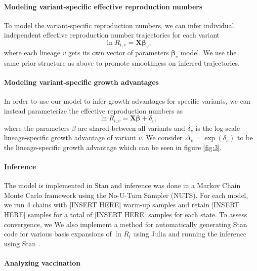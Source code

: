 \documentclass[12pt]{article}
\renewcommand{\vec}[1]{\boldsymbol{#1}}
\begin{document}
\paragraph{Modeling variant-specific effective reproduction numbers}%

To model the variant-specific reproduction numbers, we can infer individual independent effective reproduction number trajectories for each variant 
\begin{equation}
  \ln R_{t, v} = \vec{X} \vec{\beta}_{v},
\end{equation}
where each lineage $v$ gets its own vector of parameters $\vec{\beta}_{v}$ model. 
We use the same prior structure as above to promote smoothness on inferred trajectories.

\paragraph{Modeling variant-specific growth advantages}%

In order to use our model to infer growth advantages for specific variants, we can instead parameterize the effective reproduction numbers as
\begin{equation}
\ln R_{t,v} = \vec{X} \vec{\beta} + \delta_{v},
\end{equation}
where the parameters $\beta$ are shared between all variants and $\delta_{v}$ is the log-scale lineage-specific growth advantage of variant $v$. 
We consider $\Delta_{v} = \exp(\delta_{v})$ to be the lineage-specific growth advantage which can be seen in figure \ref{fig:3}.

\paragraph{Inference}%

The model is implemented in Stan and inference was done in a Markov Chain Monte Carlo framework using the No-U-Turn Sampler (NUTS). \cites{carpenter2017stan, hoffman2011nouturn} 
For each model, we run 4 chains with [INSERT HERE] warm-up samples and retain [INSERT HERE] samples for a total of [INSERT HERE] samples for each state. 
To assess convergence, we 
We also implement a method for automatically generating Stan code for various basis expansions of $\ln R_{t}$ using Julia and running the inference using Stan \cites{bezanson2017julia, carpenter2017stan}.

\paragraph{Analyzing vaccination}%
\end{document}
